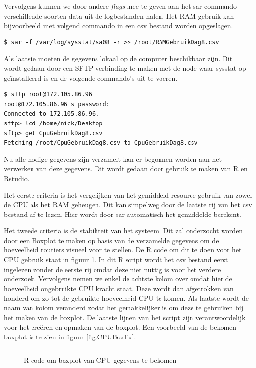 Vervolgens kunnen we door andere \textit{flags} mee te geven aan het sar commando verschillende soorten data uit de logbestanden halen. Het RAM gebruik kan bijvoorbeeld met volgend commando in een csv bestand worden opgeslagen.

\begin{verbatim} 
$ sar -f /var/log/sysstat/sa08 -r >> /root/RAMGebruikDag8.csv
\end{verbatim}

Als laatste moeten de gegevens lokaal op de computer beschikbaar zijn. Dit wordt gedaan door een SFTP verbinding te maken met de node waar sysstat op geïnstalleerd is en de volgende commando's uit te voeren. 

\begin{verbatim} 
$ sftp root@172.105.86.96
root@172.105.86.96 s password:
Connected to 172.105.86.96.
sftp> lcd /home/nick/Desktop
sftp> get CpuGebruikDag8.csv
Fetching /root/CpuGebruikDag8.csv to CpuGebruikDag8.csv
\end{verbatim}

Nu alle nodige gegevens zijn verzamelt kan er begonnen worden aan het verwerken van deze gegevens. Dit wordt gedaan door gebruik te maken van R en Rstudio. 

Het eerste criteria is het vergelijken van het gemiddeld resource gebruik van zowel de CPU als het RAM geheugen. Dit kan simpelweg door de laatste rij van het csv bestand af te lezen. Hier wordt door sar automatisch het gemiddelde berekent. 

Het tweede criteria is de stabiliteit van het systeem. Dit zal onderzocht worden door een Boxplot te maken op basis van de verzamelde gegevens om de hoeveelheid routiers visueel voor te stellen. De R code om dit te doen voor het CPU gebruik staat in figuur \ref{CPUBox}. In dit R script wordt het csv bestand eerst ingelezen zonder de eerste rij omdat deze niet nuttig is voor het verdere onderzoek. Vervolgens nemen we enkel de achtste kolom over omdat hier de hoeveelheid ongebruikte CPU kracht staat. Deze wordt dan afgetrokken van honderd om zo tot de gebruikte hoeveelheid CPU te komen. Als laatste wordt de naam van kolom veranderd zodat het gemakkelijker is om deze te gebruiken bij het maken van de boxplot. De laatste lijnen van het script zijn verantwoordelijk voor het creëren en opmaken van de boxplot. Een voorbeeld van de bekomen boxplot is te zien in figuur \ref{fig:CPUBoxEx}.

\begin{figure}[h] 
	\inputminted[fontsize=\footnotesize,linenos]{R}{files/dataCpuBox.R}
	\caption{R code om boxplot van CPU gegevens te bekomen}
	\label{CPUBox}
\end{figure}

